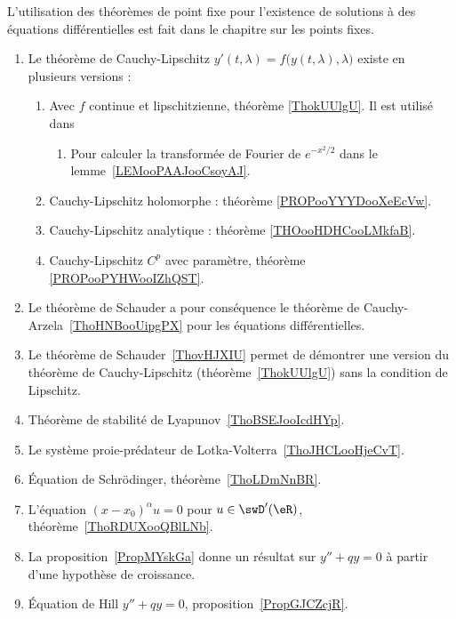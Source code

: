 	\label{THEMEooEquaDiff}
L'utilisation des théorèmes de point fixe pour l'existence de solutions à des équations différentielles est fait dans le chapitre sur les points fixes.
\begin{enumerate}
	\item
	      Le théorème de Cauchy-Lipschitz \( y'(t,\lambda)=f\big( y(t,\lambda),\lambda \big)\) existe en plusieurs versions :
	      \begin{enumerate}
		      \item Avec \( f\) continue et lipschitzienne, théorème \ref{ThokUUlgU}. Il est utilisé dans
		            \begin{enumerate}
			            \item
			                  Pour calculer la transformée de Fourier de \(  e^{-x^2/2}\) dans le lemme~\ref{LEMooPAAJooCsoyAJ}.
		            \end{enumerate}
		      \item
		            Cauchy-Lipschitz holomorphe : théorème \ref{PROPooYYYDooXeEcVw}.
		      \item
		            Cauchy-Lipschitz analytique : théorème \ref{THOooHDHCooLMkfaB}.
		      \item
		            Cauchy-Lipschitz \( C^p\) avec paramètre, théorème \ref{PROPooPYHWooIZhQST}.
	      \end{enumerate}
	\item
	      Le théorème de Schauder a pour conséquence le théorème de Cauchy-Arzela~\ref{ThoHNBooUipgPX} pour les équations différentielles.
	\item
	      Le théorème de Schauder~\ref{ThovHJXIU} permet de démontrer une version du théorème de Cauchy-Lipschitz (théorème~\ref{ThokUUlgU}) sans la condition de Lipschitz.
	\item
	      Théorème de stabilité de Lyapunov~\ref{ThoBSEJooIcdHYp}.
	\item
	      Le système proie-prédateur de Lotka-Volterra~\ref{ThoJHCLooHjeCvT}.
	\item
	      Équation de Schrödinger, théorème~\ref{ThoLDmNnBR}.
	\item
	      L'équation \( (x-x_0)^{\alpha}u=0\) pour \( u\in\swD'(\eR)\), théorème~\ref{ThoRDUXooQBlLNb}.
	\item
	      La proposition~\ref{PropMYskGa} donne un résultat sur \( y''+qy=0\) à partir d'une hypothèse de croissance.
	\item
	      Équation de Hill \( y''+qy=0\), proposition~\ref{PropGJCZcjR}.
\end{enumerate}
